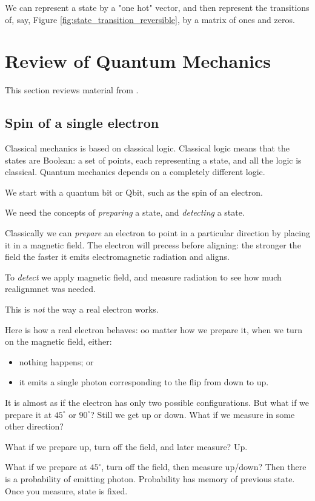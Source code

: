 \documentclass[]{article}
\begin{document}
We can represent a state by a "one hot" vector, and then represent the transitions of, say, Figure \ref{fig:state_transition_reversible}, by a matrix of ones and zeros.

\section{Review of Quantum Mechanics}

This section reviews material from \cite{susskind2013quantum}.
\subsection{Spin of a single electron}

Classical mechanics is based on classical logic. Classical logic means that the states are Boolean: a set of points, each representing a state, and all the logic is classical. Quantum mechanics depends on a completely different logic.

We start with a quantum bit or Qbit, such as the spin of an electron.

We need the concepts of \emph{preparing} a state, and \emph{detecting} a state.

Classically we can \emph{prepare} an electron to point in a particular direction by placing it in a magnetic field. The electron will precess before aligning: the stronger the field the faster it emits electromagnetic radiation and aligns.

To \emph{detect} we apply magnetic field, and measure radiation to see how much realignmnet was needed.

This is \emph{not} the way a real electron works.

Here is how a real electron behaves: oo matter how we prepare it, when we turn on the magnetic field, either:
\begin{itemize}
	\item nothing happens; or
	\item it emits a single photon corresponding to the flip from down to up.
\end{itemize}
It is almost as if the electron has only two possible configurations. But what if we prepare it at $45^\circ$ or $90^\circ$? Still we get up or down. What if we measure in some other direction?

What if we prepare up, turn off the field, and later measure? Up.

What if we prepare at $45^\circ$, turn off the field, then measure up/down? Then there is a probability of emitting photon. Probability has memory of previous state. Once you measure, state is fixed.
\end{document}
